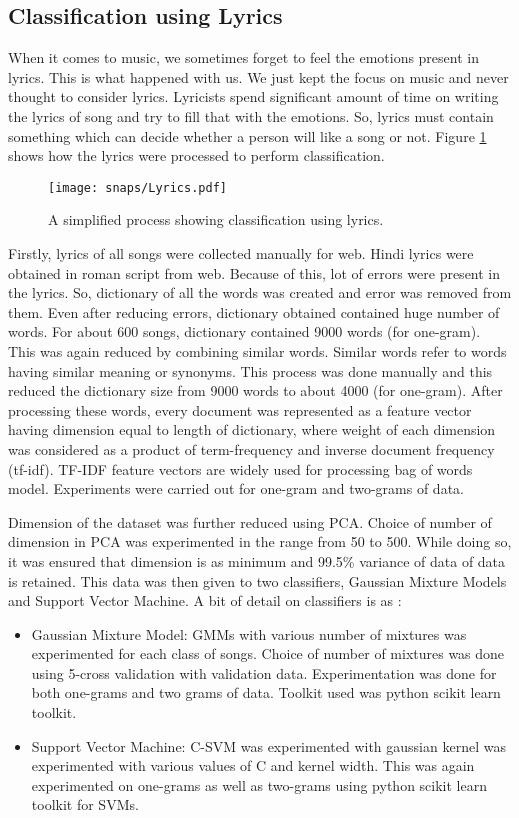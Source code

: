\subsection{Classification using Lyrics}
\label{sub:lyric}
When it comes to music, we sometimes forget to feel the emotions present in lyrics. This is what happened with us. We just kept the focus on music and never thought to consider lyrics. Lyricists spend significant amount of time on writing the lyrics of song and try to fill that with the emotions. So, lyrics must contain something which can decide whether a person will like a song or not. Figure \ref{fig:lyric} shows how the lyrics were processed to perform classification.
\begin{figure}[!htbp]
\centering
\texttt{[image: snaps/Lyrics.pdf]}
\caption{A simplified process showing classification using lyrics.}
\label{fig:lyric}
\end{figure}
Firstly, lyrics of all songs were collected manually for web. Hindi lyrics were obtained in roman script from web. Because of this, lot of errors were present in the lyrics. So, dictionary of all the words was created and error was removed from them. Even after reducing errors, dictionary obtained contained huge number of words. For about 600 songs, dictionary contained 9000 words (for one-gram). This was again reduced by combining similar words. Similar words refer to words having similar meaning or synonyms. This process was done manually and this reduced the dictionary size from 9000 words to about 4000 (for one-gram). After processing these words, every document was represented as a feature vector having dimension equal to length of dictionary, where weight of each dimension was considered as a product of term-frequency and inverse document frequency (tf-idf). TF-IDF feature vectors are widely used for processing bag of words model. Experiments were carried out for one-gram and two-grams of data.\par
Dimension of the dataset was further reduced using PCA. Choice of number of dimension in PCA was experimented in the range from 50 to 500. While doing so, it was ensured that dimension is as minimum and 99.5\% variance of data of data is retained. This data was then given to two classifiers, Gaussian Mixture Models and Support Vector Machine. A bit of detail on classifiers is as :
\begin{itemize}
\item Gaussian Mixture Model: GMMs with various number of mixtures was experimented for each class of songs. Choice of number of mixtures was done using 5-cross validation with validation data. Experimentation was done for both one-grams and two grams of data. Toolkit used was python scikit learn toolkit.
\item Support Vector Machine: C-SVM was experimented with gaussian kernel was experimented with various values of C and kernel width. This was again experimented on one-grams as well as two-grams using python scikit learn toolkit for SVMs.
\end{itemize}
